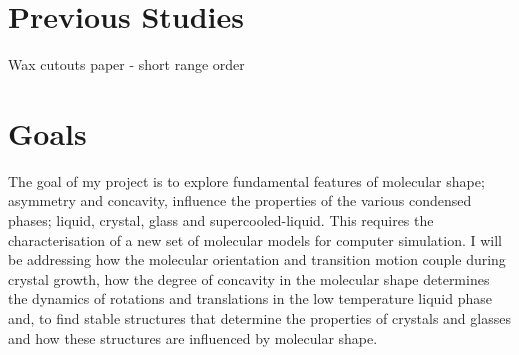 \section{Previous Studies}
Wax cutouts paper - short range order

\section{Goals}

The goal of my project is to explore fundamental features of molecular shape; asymmetry and concavity, influence the properties of the various condensed phases; liquid, crystal, glass and supercooled-liquid. This requires the characterisation of a new set of molecular models for computer simulation. I will be addressing how the molecular orientation and transition motion couple during crystal growth, how the degree of concavity in the molecular shape determines the dynamics of rotations and translations in the low temperature liquid phase and, to find stable structures that determine the properties of crystals and glasses and how these structures are influenced by molecular shape.

